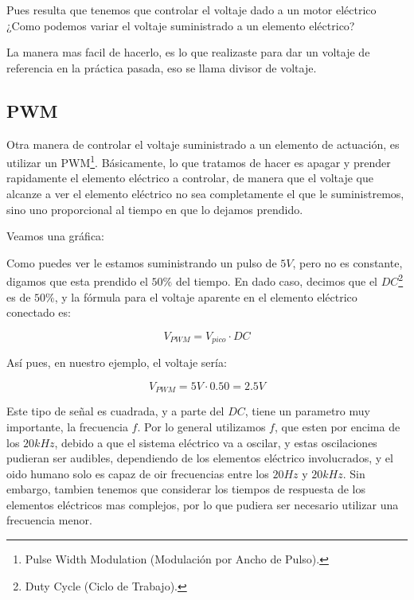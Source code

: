 		Pues resulta que tenemos que controlar el voltaje dado a un motor eléctrico ¿Como podemos variar el voltaje suministrado a un elemento eléctrico?

		La manera mas facil de hacerlo, es lo que realizaste para dar un voltaje de referencia en la práctica pasada, eso se llama divisor de voltaje.


	\subsection{PWM}

		Otra manera de controlar el voltaje suministrado a un elemento de actuación, es utilizar un PWM\footnote{Pulse Width Modulation (Modulación por Ancho de Pulso).}. Básicamente, lo que tratamos de hacer es apagar y prender rapidamente el elemento eléctrico a controlar, de manera que el voltaje que alcanze a ver el elemento eléctrico no sea completamente el que le suministremos, sino uno proporcional al tiempo en que lo dejamos prendido.

		Veamos una gráfica:


		Como puedes ver le estamos suministrando un pulso de $5 V$, pero no es constante, digamos que esta prendido el $50\%$ del tiempo. En dado caso, decimos que el $DC$\footnote{Duty Cycle (Ciclo de Trabajo).} es de $50\%$, y la fórmula para el voltaje aparente en el elemento eléctrico conectado es:

		\begin{equation}
			V_{PWM} = V_{pico} \cdot DC
		\end{equation}

		Así pues, en nuestro ejemplo, el voltaje sería:

		\begin{equation}
			V_{PWM} = 5 V \cdot 0.50 = 2.5 V
		\end{equation}

		Este tipo de señal es cuadrada, y a parte del $DC$, tiene un parametro muy importante, la frecuencia $f$. Por lo general utilizamos $f$, que esten por encima de los $20 kHz$, debido a que el sistema eléctrico va a oscilar, y estas oscilaciones pudieran ser audibles, dependiendo de los elementos eléctrico involucrados, y el oido humano solo es capaz de oir frecuencias entre los $20 Hz$ y $20 kHz$. Sin embargo, tambien tenemos que considerar los tiempos de respuesta de los elementos eléctricos mas complejos, por lo que pudiera ser necesario utilizar una frecuencia menor.

